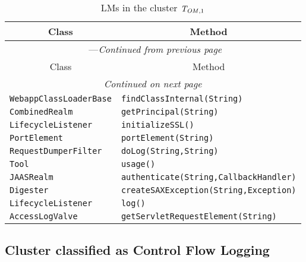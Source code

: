 \begin{center}
\begin{longtable}{ll}
\caption{LMs in the cluster $\mathit{T}_{\mathit{OM},1}$}\\
\toprule\multicolumn{1}{c}{Class}&\multicolumn{1}{c}{Method}\\\midrule
\endfirsthead

\multicolumn{2}{c}{\tablename\ \thetable{}---\textit{Continued from previous page}} \\\midrule
\multicolumn{1}{c}{Class}&\multicolumn{1}{c}{Method}\\\midrule
\endhead
\multicolumn{2}{c}{\textit{Continued on next page}}\\\midrule
\endfoot
\bottomrule
\endlastfoot

\lstinline/WebappClassLoaderBase/&{\lstinline/findClassInternal(String)/}\\
\lstinline/CombinedRealm/&{\lstinline/getPrincipal(String)/}\\
\lstinline/LifecycleListener/&{\lstinline/initializeSSL()/}\\
\lstinline/PortElement/&{\lstinline/portElement(String)/}\\
\lstinline/RequestDumperFilter/&{\lstinline/doLog(String,String)/}\\
\lstinline/Tool/&{\lstinline/usage()/}\\
\lstinline/JAASRealm/&{\lstinline/authenticate(String,CallbackHandler)/}\\
\lstinline/Digester/&{\lstinline/createSAXException(String,Exception)/}\\
\lstinline/LifecycleListener/&{\lstinline/log()/}\\
\lstinline/AccessLogValve/&{\lstinline/getServletRequestElement(String)/}\\
\end{longtable}
\end{center}

\subsection{Cluster classified as Control Flow Logging}

